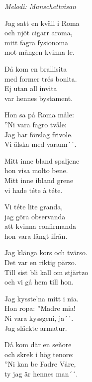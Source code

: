 {\footnotesize\textit{Melodi: Manschettvisan}}\par
\vspace{10pt}
Jag satt en kväll i Roma\\
och njöt cigarr aroma,\\
mitt fagra fysionoma\\
mot mången kvinna le.\par
\vspace{10pt}
Då kom en brallisita\\
med former trés bonita.\\
Ej utan all invita\\
var hennes bystament.\par
\vspace{10pt}
Hon sa på Roma måle:\\
''Ni vara fagro tvåle:\\
Jag har förslag frivole.\\
Vi älska med varann´´.\par
\vspace{10pt}
Mitt inne bland spaljene\\
hon visa molto bene.\\
Mitt inne ibland grene\\
vi hade téte à téte.\par
\vspace{10pt}
Vi téte lite granda,\\
jag göra observanda\\
att kvinna confirmanda\\
hon vara långt ifrån.\par
\vspace{10pt}
Jag klänga kors och tvärso.\\
Det var en riktig pärzo.\\
Till sist bli kall om stjärtzo\\
och vi gå hem till hon.\par
\vspace{10pt}
Jag kysste'na mitt i nia.\\
Hon ropa: ''Madre mia!\\
Ni vara kyssgeni, ja´´.\\
Jag släckte armatur.\par
\vspace{10pt}
Då kom där en señore\\
och skrek i hög tenore:\\
''Ni kan be Fadre Våre,\\
ty jag är hennes man´´.\par
